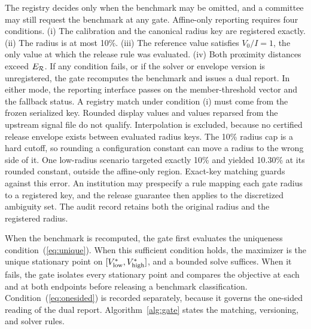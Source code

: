The registry decides only when the benchmark may be omitted, and a committee may still request the benchmark at any gate. Affine-only reporting requires four conditions. (i) The calibration and the canonical radius key are registered exactly. (ii) The radius is at most 10\%. (iii) The reference value satisfies $V_0/I=1$, the only value at which the release rule was evaluated. (iv) Both proximity distances exceed $E_{\mathcal{R}}$. If any condition fails, or if the solver or envelope version is unregistered, the gate recomputes the benchmark and issues a dual report. In either mode, the reporting interface passes on the member-threshold vector and the fallback status. A registry match under condition (i) must come from the frozen serialized key. Rounded display values and values reparsed from the upstream signal file do not qualify. Interpolation is excluded, because no certified release envelope exists between evaluated radius keys. The 10\% radius cap is a hard cutoff, so rounding a configuration constant can move a radius to the wrong side of it. One low-radius scenario targeted exactly 10\% and yielded 10.30\% at its rounded constant, outside the affine-only region. Exact-key matching guards against this error. An institution may prespecify a rule mapping each gate radius to a registered key, and the release guarantee then applies to the discretized ambiguity set. The audit record retains both the original radius and the registered radius.

When the benchmark is recomputed, the gate first evaluates the uniqueness condition~(\ref{eq:unique}). When this sufficient condition holds, the maximizer is the unique stationary point on $[V^{*}_{\mathrm{low}},V^{*}_{\mathrm{high}}]$, and a bounded solve suffices. When it fails, the gate isolates every stationary point and compares the objective at each and at both endpoints before releasing a benchmark classification. Condition~(\ref{eq:onesided}) is recorded separately, because it governs the one-sided reading of the dual report. Algorithm~\ref{alg:gate} states the matching, versioning, and solver rules.

